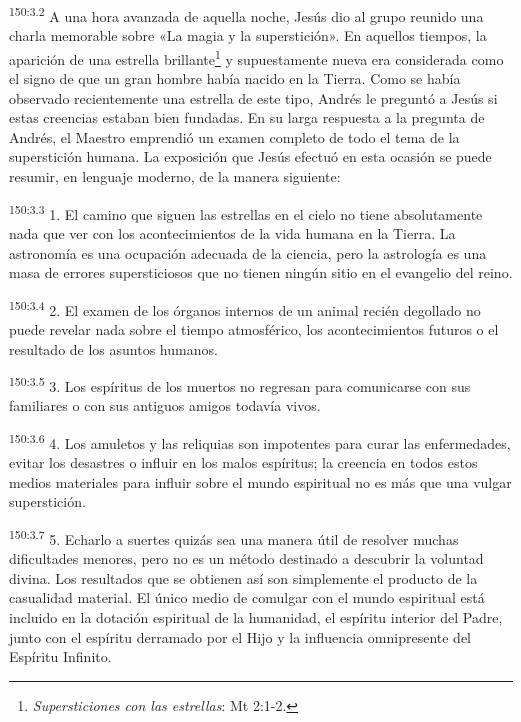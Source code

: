 \par
\textsuperscript{150:3.2} A una hora avanzada de aquella noche, Jesús dio al grupo reunido una charla memorable sobre «La magia y la superstición». En aquellos tiempos, la aparición de una estrella brillante\footnote{\textit{Supersticiones con las estrellas}: Mt 2:1-2.} y supuestamente nueva era considerada como el signo de que un gran hombre había nacido en la Tierra. Como se había observado recientemente una estrella de este tipo, Andrés le preguntó a Jesús si estas creencias estaban bien fundadas. En su larga respuesta a la pregunta de Andrés, el Maestro emprendió un examen completo de todo el tema de la superstición humana. La exposición que Jesús efectuó en esta ocasión se puede resumir, en lenguaje moderno, de la manera siguiente:

\par
\textsuperscript{150:3.3} 1. El camino que siguen las estrellas en el cielo no tiene absolutamente nada que ver con los acontecimientos de la vida humana en la Tierra. La astronomía es una ocupación adecuada de la ciencia, pero la astrología es una masa de errores supersticiosos que no tienen ningún sitio en el evangelio del reino.

\par
\textsuperscript{150:3.4} 2. El examen de los órganos internos de un animal recién degollado no puede revelar nada sobre el tiempo atmosférico, los acontecimientos futuros o el resultado de los asuntos humanos.

\par
\textsuperscript{150:3.5} 3. Los espíritus de los muertos no regresan para comunicarse con sus familiares o con sus antiguos amigos todavía vivos.

\par
\textsuperscript{150:3.6} 4. Los amuletos y las reliquias son impotentes para curar las enfermedades, evitar los desastres o influir en los malos espíritus; la creencia en todos estos medios materiales para influir sobre el mundo espiritual no es más que una vulgar superstición.

\par
\textsuperscript{150:3.7} 5. Echarlo a suertes quizás sea una manera útil de resolver muchas dificultades menores, pero no es un método destinado a descubrir la voluntad divina. Los resultados que se obtienen así son simplemente el producto de la casualidad material. El único medio de comulgar con el mundo espiritual está incluido en la dotación espiritual de la humanidad, el espíritu interior del Padre, junto con el espíritu derramado por el Hijo y la influencia omnipresente del Espíritu Infinito.

